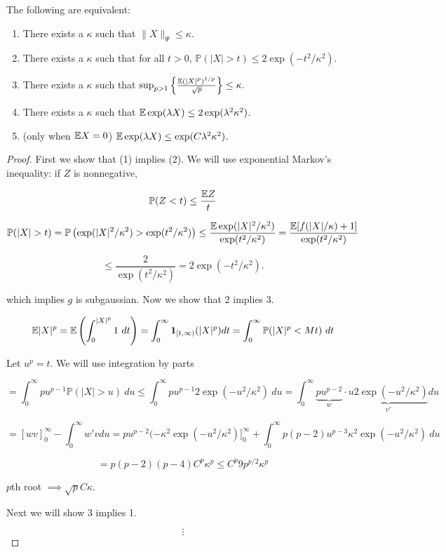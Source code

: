 \begin{proposition}

The following are equivalent:

\begin{enumerate}

\item There exists a \(\kappa\) such that \(\lVert X \rVert_\Psi \leq \kappa\). 

\item There exists a \(\kappa\) such that for all \(t > 0\), \(\mathbb{P}(|X| > t) \leq 2 \exp(-t^2/\kappa^2)\). 

\item There exists a \(\kappa\) such that \(\sup_{p>1} \left\{ \frac{ \mathbb{E}(|X|^p)^{1/p}}{\sqrt{p}} \right\} \leq \kappa.\)

\item There exists a \(\kappa\) such that \(\mathbb{E} \exp(\lambda X) \leq 2 \exp(\lambda^2 \kappa^2)\). 

\item (only when \(\mathbb{E} X = 0\)) \(\mathbb{E} \exp(\lambda X) \leq \exp( C\lambda^2 \kappa^2)\). 

\end{enumerate}

\end{proposition}

\begin{proof}

First we show that (1) implies (2). We will use exponential Markov's inequality: if \(Z\) is nonnegative,

\[
\mathbb{P}(Z < t) \leq \frac{\mathbb{E} Z}{t} 
\]

\[
\mathbb{P}(|X| > t) = \mathbb{P}\left (\exp (|X|^2/\kappa^2) > \exp (t^2/\kappa^2) \right) \leq \frac{ \mathbb{E} \exp(|X|^2/\kappa^2)}{\exp (t^2/\kappa^2)} = \frac{ \mathbb{E} [f(|X|/\kappa) + 1]}{\exp (t^2/\kappa^2)}
\]

\[
  \leq \frac{2}{\exp(t^2/\kappa^2)} = 2 \exp(- t^2/\kappa^2).
\]

which implies \(g\) is subgaussian. Now we show that 2 implies 3.

\[
\E |X|^p = \E \left( \int_0^{|X|^p} 1 \ dt \right) = \int_0^\infty \boldsymbol{1}_{[t, \infty)} (|X|^p) dt = \int_0^\infty \mathbb{P}(|X|^p <M t) \ dt
\]

Let \(u^p = t\). We will use integration by parts

\[
= \int_0^\infty pu^{p-1} \mathbb{P}(|X| > u) \ du \leq \int_0^\infty pu^{p - 1} 2 \exp(-u^2/\kappa^2) \ du = \int_0^\infty  \underbrace{pu^{p-2}}_w \cdot \underbrace{u 2 \exp(-u^2/\kappa^2)}_{v'} du
\]

\[
= \left[ wv \right]_0^\infty - \int_0^\infty w'v du = pu^{p-2} (-\kappa^2 \exp(-u^2/\kappa^2) ]_0^\infty + \int_0^\infty p(p-2)u^{p-3} \kappa^2 \exp(-u^2/\kappa^2) \ du
\]

\[
= p(p-2)(p-4) C^p \kappa^p \leq C^p 9p^{p/2}  \kappa^p 
\]

\(p\)th root \(\implies \sqrt{p} C \kappa\). 

Next we will show 3 implies 1.

\[
\vdots
\]

\end{proof}

